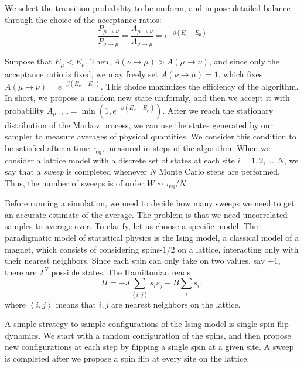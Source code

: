 We select the transition probability to be uniform, and impose detailed balance through the choice of the acceptance ratios:
\begin{equation}
\frac{ P_{\mu\rightarrow\nu }}{ P_{\nu\rightarrow\mu }} = \frac{ A_{\mu\rightarrow\nu }}{ A_{\nu\rightarrow\mu } } = e^{-\beta ( E_\nu - E_\mu )}
\end{equation}

Suppose that $E_\mu < E_\nu $.
Then, $A ( \nu \rightarrow \mu ) > A ( \mu \rightarrow \nu ) $, and since only the acceptance ratio is fixed, we may freely set $A ( \nu \rightarrow \mu ) = 1$, which fixes $A ( \mu \rightarrow \nu ) = e^{-\beta ( E_\nu - E_\mu ) }$.
This choice maximizes the efficiency of the algorithm.
In short, we propose a random new state uniformly, and then we accept it with probability $A_{\mu\rightarrow \nu} = \min (1,  e^{-\beta ( E_\nu - E_\mu )})$.
After we reach the stationary distribution of the Markov process, we can use the states generated by our sampler to measure averages of physical quantities.
We consider this condition to be satisfied after a time $\tau_{\text{eq}}$, measured in steps of the algorithm.
When we consider a lattice model with a discrete set of states at each site $i = 1, 2, ..., N$, we say that a \emph{sweep} is completed whenever $N$ Monte Carlo steps are performed.
Thus, the number of  sweeps is of order $W \sim \tau_{\text{eq}} / N$.

Before running a simulation, we need to decide how many sweeps we need to get an accurate estimate of the average.
The problem is that we need uncorrelated samples to average over.
To clarify, let us choose a specific model.
The paradigmatic model of statistical physics is the Ising model, a classical model of a magnet, which consists of considering spins-$1/2$ on a lattice, interacting only with their nearest neighbors.
Since each spin can only take on two values, say $\pm 1$, there are $2^N$ possible states.
The Hamiltonian reads
\begin{equation}
H = - J \sum_{\left\langle i, j \right\rangle } s_i s_j - B \sum_i s_i ,
\end{equation}
where $\left\langle i, j \right\rangle$ means that $i, j $ are nearest neighbors on the lattice.

A simple strategy to sample configurations of the Ising model is single-spin-flip dynamics.
We start with a random configuration of the spins, and then propose new configurations at each step by flipping a single spin at a given site.
A sweep is completed after we propose a spin flip at every site on the lattice.

